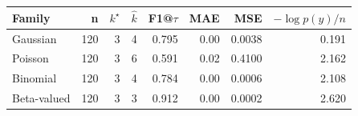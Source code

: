 \begin{tabular}{lrrrrrrr}\toprule
Family & n & $k^\star$ & $\hat{k}$ & F1@$\tau$ & MAE & MSE & $-\log p(y)/n$\\\midrule
Gaussian & 120 & 3 & 4 & 0.795 & 0.00 & 0.0038 & 0.191\\
Poisson & 120 & 3 & 6 & 0.591 & 0.02 & 0.4100 & 2.162\\
Binomial & 120 & 3 & 4 & 0.784 & 0.00 & 0.0006 & 2.108\\
Beta-valued & 120 & 3 & 3 & 0.912 & 0.00 & 0.0002 & 2.620\\
\bottomrule\end{tabular}
